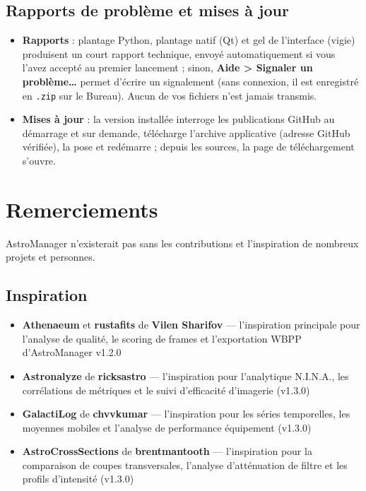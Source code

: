 \documentclass[a4paper,11pt]{article}
\newcommand{\menu}[1]{\textsf{\textbf{\textcolor{sky}{#1}}}}
\begin{document}
\subsection{Rapports de problème et mises à jour}

\begin{itemize}
    \item \textbf{Rapports} : plantage Python, plantage natif (Qt) et gel de
    l'interface (vigie) produisent un court rapport technique, envoyé
    automatiquement si vous l'avez accepté au premier lancement ; sinon,
    \menu{Aide > Signaler un problème\dots} permet d'écrire un signalement
    (sans connexion, il est enregistré en \texttt{.zip} sur le Bureau).
    Aucun de vos fichiers n'est jamais transmis.
    \item \textbf{Mises à jour} : la version installée interroge les
    publications GitHub au démarrage et sur demande, télécharge l'archive
    applicative (adresse GitHub vérifiée), la pose et redémarre ; depuis les
    sources, la page de téléchargement s'ouvre.
\end{itemize}
\section{Remerciements}
\label{sec:remerciements}

AstroManager n'existerait pas sans les contributions et l'inspiration de nombreux projets et personnes.

\subsection{Inspiration}

\begin{itemize}
    \item \textbf{Athenaeum} et \textbf{rustafits} de \textbf{Vilen Sharifov} --- l'inspiration principale pour l'analyse de qualit\'{e}, le scoring de frames et l'exportation WBPP d'AstroManager v1.2.0
    \item \textbf{Astronalyze} de \textbf{ricksastro} --- l'inspiration pour l'analytique N.I.N.A., les corr\'{e}lations de m\'{e}triques et le suivi d'efficacit\'{e} d'imagerie (v1.3.0)
    \item \textbf{GalactiLog} de \textbf{chvvkumar} --- l'inspiration pour les s\'{e}ries temporelles, les moyennes mobiles et l'analyse de performance \'{e}quipement (v1.3.0)
    \item \textbf{AstroCrossSections} de \textbf{brentmantooth} --- l'inspiration pour la comparaison de coupes transversales, l'analyse d'att\'{e}nuation de filtre et les profils d'intensit\'{e} (v1.3.0)
\end{itemize}
\end{document}
